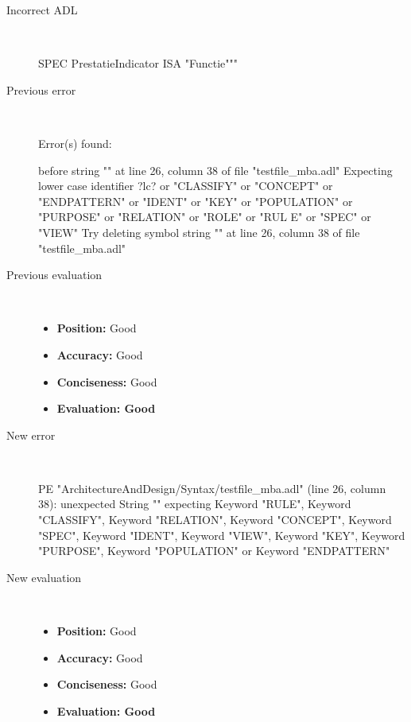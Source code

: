 \hrulefill

\begin{description}
  \item[Incorrect ADL]~\\
\begin{adl}
SPEC PrestatieIndicator ISA "Functie"""\end{adl}
  \item[Previous error]~\\
\begin{haskell}
Error(s) found:

before string "" at line 26, column 38 of file "testfile_mba.adl"
Expecting lower case identifier ?lc? or "CLASSIFY" or "CONCEPT" or "ENDPATTERN"
or "IDENT" or "KEY" or "POPULATION" or "PURPOSE" or "RELATION" or "ROLE" or "RUL
E" or "SPEC" or "VIEW"
Try deleting symbol string "" at line 26, column 38 of file "testfile_mba.adl"\end{haskell}
  \item[Previous evaluation]~\\
    \begin{itemize}
    \item \textbf{Position:} Good
    \item \textbf{Accuracy:} Good
    \item \textbf{Conciseness:} Good
    \item \textbf{Evaluation: Good}
    \end{itemize}
  \item[New error]~\\
\begin{haskell}
PE "ArchitectureAndDesign/Syntax/testfile_mba.adl" (line 26, column 38):
unexpected String ""
expecting Keyword "RULE", Keyword "CLASSIFY", Keyword "RELATION", Keyword "CONCEPT", Keyword "SPEC", Keyword "IDENT", Keyword "VIEW", Keyword "KEY", Keyword "PURPOSE", Keyword "POPULATION" or Keyword "ENDPATTERN"\end{haskell}
  \item[New evaluation]~\\
    \begin{itemize}
    \item \textbf{Position:} Good
    \item \textbf{Accuracy:} Good
    \item \textbf{Conciseness:} Good
    \item \textbf{Evaluation: Good}
    \end{itemize}
  \end{description}

